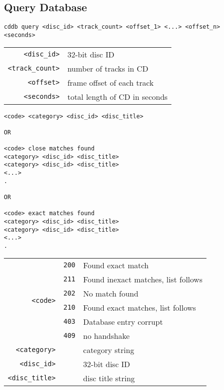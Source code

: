 \subsection{Query Database}
\begin{Verbatim}[frame=single,label=\textit{To Server},showspaces=true]
cddb query <disc_id> <track_count> <offset_1> <...> <offset_n> <seconds>
\end{Verbatim}
\begin{tabular}{rl}
\texttt{<disc\_id>} & 32-bit disc ID \\
\texttt{<track\_count>} & number of tracks in CD \\
\texttt{<offset>} & frame offset of each track \\
\texttt{<seconds>} & total length of CD in seconds
\end{tabular}
\begin{Verbatim}[frame=single,label=\textit{From Server},showspaces=true]
<code> <category> <disc_id> <disc_title>

OR

<code> close matches found
<category> <disc_id> <disc_title>
<category> <disc_id> <disc_title>
<...>
.

OR

<code> exact matches found
<category> <disc_id> <disc_title>
<category> <disc_id> <disc_title>
<...>
.
\end{Verbatim}
\begin{tabular}{rcl}
\multirow{6}{3em}{\texttt{<code>}}
& \texttt{200} & Found exact match \\
& \texttt{211} & Found inexact matches, list follows \\
& \texttt{202} & No match found \\
& \texttt{210} & Found exact matches, list follows \\
& \texttt{403} & Database entry corrupt \\
& \texttt{409} & no handshake \\
\texttt{<category>} & & category string \\
\texttt{<disc\_id>} & & 32-bit disc ID \\
\texttt{<disc\_title>} & & disc title string
\end{tabular}

\pagebreak

